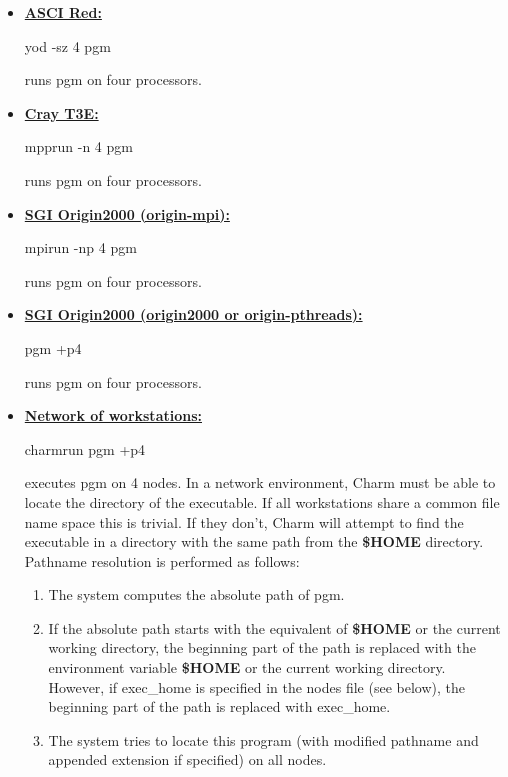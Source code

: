 \begin{itemize}

\item \underline{\bf ASCI Red:} 
	\begin{tabbing}
	{\fexec yod -sz 4 pgm}
	\end{tabbing}
	runs {\fparm pgm} on four processors.

\item \underline{\bf Cray T3E:} 
	\begin{tabbing}
	{\fexec mpprun -n 4 pgm}
	\end{tabbing}
	runs {\fparm pgm} on four processors.

\item \underline{\bf SGI Origin2000 (origin-mpi):} 
	\begin{tabbing}
	{\fexec mpirun -np 4 pgm}
	\end{tabbing}
	runs {\fparm pgm} on four processors.

\item \underline{\bf SGI Origin2000 (origin2000 or origin-pthreads):} 
	\begin{tabbing}
	{\fexec pgm +p4}
	\end{tabbing}
	runs {\fparm pgm} on four processors.

\item \underline{\bf Network of workstations:} 
	\begin{tabbing}
	{\fexec charmrun pgm +p4}
	\end{tabbing}
	executes {\fparm pgm} on 4 nodes.  In a network environment, Charm must
	be able to locate the directory of the executable.  If all workstations
	share a common file name space this is trivial.  If they don't, Charm
	will attempt to find the executable in a directory with the same path
	from the {\bf \$HOME} directory.  Pathname resolution is performed as 
	follows:
	\begin{enumerate}
		\item The system computes the absolute path of {\fexec pgm}.
		\item If the absolute path starts with the equivalent of {\bf \$HOME} 
			or the current working directory, the beginning part of the path 
			is replaced with the environment variable {\bf \$HOME} or the 
			current working directory. However, if {\fparm exec\_home} is 
            specified in the nodes file (see below), the beginning part of
            the path is replaced with {\fparm exec\_home}.
		\item The system tries to locate this program (with modified 
			pathname and appended extension if specified) on all nodes.
	\end{enumerate}


\end{itemize}
